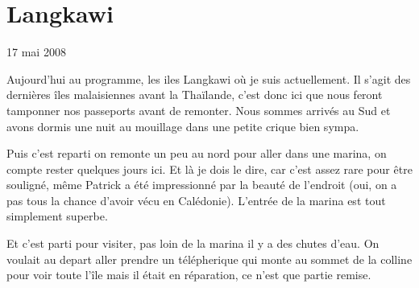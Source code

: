 \section{Langkawi}

17 mai 2008

\begin{multicols}{2}

Aujourd'hui au programme, les iles Langkawi où je suis actuellement. Il s'agit des dernières îles malaisiennes avant la Thaïlande, c'est donc ici que nous feront tamponner nos passeports avant de remonter. Nous sommes arrivés au Sud et avons dormis une nuit au mouillage dans une petite crique bien sympa.


Puis c'est reparti on remonte un peu au nord pour aller dans une marina, on compte rester quelques jours ici. Et là je dois le dire, car c'est assez rare pour être souligné, même Patrick a été impressionné par la beauté de l'endroit (oui, on a pas tous la chance d'avoir vécu en Calédonie). L'entrée de la marina est tout simplement superbe.




Et c'est parti pour visiter, pas loin de la marina il y a des chutes d'eau. On voulait au depart aller prendre un télépherique qui monte au sommet de la colline pour voir toute l'île mais il était en réparation, ce n'est que partie remise.



\end{multicols}
